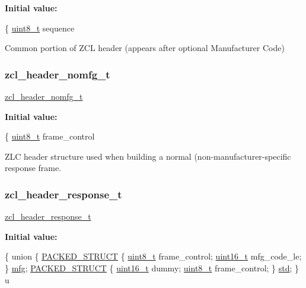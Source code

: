{\bfseries Initial value\+:}
\begin{DoxyCode}
\{
   \hyperlink{group__hal__dos_gae1affc9ca37cfb624959c866a73f83c2}{uint8\_t} sequence
\end{DoxyCode}


Common portion of Z\+CL header (appears after optional Manufacturer Code) 

\mbox{\label{group__zcl_gae988eb59c8a2e75b6cb34aefeca315d1}} 
\subsubsection{\texorpdfstring{zcl\+\_\+header\+\_\+nomfg\+\_\+t}{zcl\_header\_nomfg\_t}}
{\footnotesize\ttfamily \hyperlink{group__zcl_gae988eb59c8a2e75b6cb34aefeca315d1}{zcl\+\_\+header\+\_\+nomfg\+\_\+t}}

{\bfseries Initial value\+:}
\begin{DoxyCode}
\{
   \hyperlink{group__hal__dos_gae1affc9ca37cfb624959c866a73f83c2}{uint8\_t} frame\_control
\end{DoxyCode}


Z\+LC header structure used when building a normal (non-\/manufacturer-\/specific response frame. 

\mbox{\label{group__zcl_gaeac1f6671916dd0ad92b271080ec272a}} 
\subsubsection{\texorpdfstring{zcl\+\_\+header\+\_\+response\+\_\+t}{zcl\_header\_response\_t}}
{\footnotesize\ttfamily \hyperlink{group__zcl_gaeac1f6671916dd0ad92b271080ec272a}{zcl\+\_\+header\+\_\+response\+\_\+t}}

{\bfseries Initial value\+:}
\begin{DoxyCode}
\{
   \textcolor{keyword}{union }\{
      \hyperlink{group___s_x_a_ga4233297bd31be5c273d4fb0758cc54d7}{PACKED\_STRUCT} \{
         \hyperlink{group__hal__dos_gae1affc9ca37cfb624959c866a73f83c2}{uint8\_t}    frame\_control;
         \hyperlink{group__hal__dos_ga5a8b2dc9e45a9ee81a94ef304fb62505}{uint16\_t}     mfg\_code\_le;
      \} \hyperlink{group__zcl_gacef7f7e36d411b8000d1ac172c5e8782}{mfg};
      \hyperlink{group___s_x_a_ga4233297bd31be5c273d4fb0758cc54d7}{PACKED\_STRUCT} \{
         \hyperlink{group__hal__dos_ga5a8b2dc9e45a9ee81a94ef304fb62505}{uint16\_t}     dummy;
         \hyperlink{group__hal__dos_gae1affc9ca37cfb624959c866a73f83c2}{uint8\_t}    frame\_control;
      \} \hyperlink{group__zcl_ga36fda9bc88c532ecc94200bcd756b1d3}{std};
   \} u
\end{DoxyCode}


